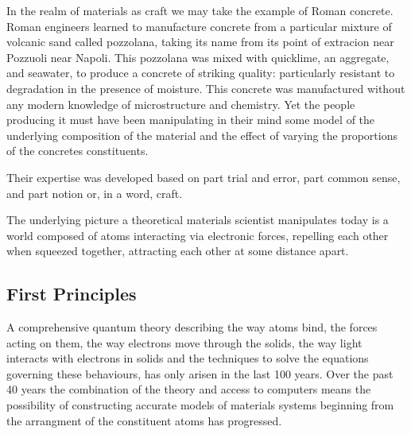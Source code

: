 In the realm of materials as craft we may take the example of Roman concrete.
%
Roman engineers learned to manufacture concrete from a 
particular mixture of volcanic sand called pozzolana,
taking its name from its point of extracion near Pozzuoli near Napoli. 
%
This pozzolana was mixed with quicklime, an aggregate, and seawater,
to produce a concrete of striking quality: 
particularly resistant to degradation in the presence of moisture.
This concrete was manufactured without any modern knowledge of microstructure 
and chemistry. Yet the people producing it must have been manipulating in their
mind some model of the underlying composition of the material and the effect of 
varying the proportions of the concretes constituents. 
%
%

Their expertise was developed based on part trial and error, 
part common sense, and part notion or, in a word, craft.

The underlying picture a theoretical materials scientist manipulates today
is a world composed of atoms interacting via electronic forces,
repelling each other when squeezed together, attracting each other at some
distance apart. 

\subsection{First Principles}
A comprehensive quantum theory describing the way atoms bind, the forces acting on them, 
the way electrons move through the solids, the way light interacts with electrons in solids
and the techniques to solve the equations governing these behaviours, has only 
arisen in the last 100 years. 
%
Over the past 40 years the combination of the theory and access to computers 
means the possibility of constructing accurate models of materials 
systems beginning from the arrangment of the constituent atoms has
progressed. 
%

